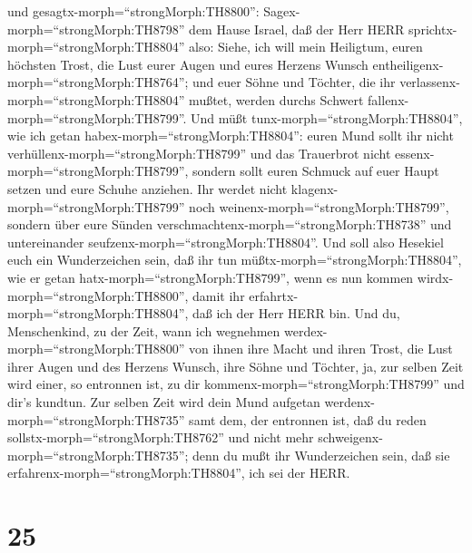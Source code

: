 und gesagtx-morph=``strongMorph:TH8800'': 
Sagex-morph=``strongMorph:TH8798'' dem Hause Israel, daß der Herr HERR
sprichtx-morph=``strongMorph:TH8804'' also: Siehe, ich will mein
Heiligtum, euren höchsten Trost, die Lust eurer Augen und eures Herzens
Wunsch entheiligenx-morph=``strongMorph:TH8764''; und euer Söhne und
Töchter, die ihr verlassenx-morph=``strongMorph:TH8804'' mußtet, werden
durchs Schwert fallenx-morph=``strongMorph:TH8799''.  Und
müßt tunx-morph=``strongMorph:TH8804'', wie ich getan
habex-morph=``strongMorph:TH8804'': euren Mund sollt ihr nicht
verhüllenx-morph=``strongMorph:TH8799'' und das Trauerbrot nicht
essenx-morph=``strongMorph:TH8799'',  sondern sollt euren
Schmuck auf euer Haupt setzen und eure Schuhe anziehen. Ihr werdet nicht
klagenx-morph=``strongMorph:TH8799'' noch
weinenx-morph=``strongMorph:TH8799'', sondern über eure Sünden
verschmachtenx-morph=``strongMorph:TH8738'' und untereinander
seufzenx-morph=``strongMorph:TH8804''.  Und soll also
Hesekiel euch ein Wunderzeichen sein, daß ihr tun
müßtx-morph=``strongMorph:TH8804'', wie er getan
hatx-morph=``strongMorph:TH8799'', wenn es nun kommen
wirdx-morph=``strongMorph:TH8800'', damit ihr
erfahrtx-morph=``strongMorph:TH8804'', daß ich der Herr HERR bin.
 Und du, Menschenkind, zu der Zeit, wann ich wegnehmen
werdex-morph=``strongMorph:TH8800'' von ihnen ihre Macht und ihren
Trost, die Lust ihrer Augen und des Herzens Wunsch, ihre Söhne und
Töchter,  ja, zur selben Zeit wird einer, so entronnen ist,
zu dir kommenx-morph=``strongMorph:TH8799'' und dir's kundtun.
 Zur selben Zeit wird dein Mund aufgetan
werdenx-morph=``strongMorph:TH8735'' samt dem, der entronnen ist, daß du
reden sollstx-morph=``strongMorph:TH8762'' und nicht mehr
schweigenx-morph=``strongMorph:TH8735''; denn du mußt ihr Wunderzeichen
sein, daß sie erfahrenx-morph=``strongMorph:TH8804'', ich sei der HERR.

\hypertarget{section-24}{%
\section{25}\label{section-24}}


